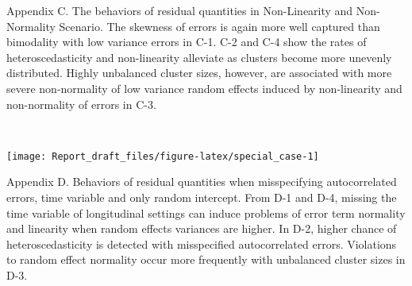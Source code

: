 \documentclass[12pt]{article}
\begin{document}
\vspace{-10pt}

\begin{spacing}{0.5}
\begingroup
{}\fontsize{6}{16}\selectfont
Appendix C. The behaviors of residual quantities in Non-Linearity and Non-Normality Scenario.
The skewness of errors is again more well captured than bimodality with low variance errors in C-1. C-2 and C-4 show the rates of heteroscedasticity and non-linearity alleviate as clusters become more unevenly distributed. Highly unbalanced cluster sizes, however, are associated with more severe non-normality of low variance random effects induced by non-linearity and non-normality of errors in C-3. 
\endgroup
\end{spacing}

~

\begin{center}\texttt{[image: Report\_draft\_files/figure-latex/special\_case-1]} \end{center}

\vspace{-10pt}

\begin{spacing}{0.5}
\begingroup
{}\fontsize{6}{16}\selectfont
Appendix D. Behaviors of residual quantities when misspecifying autocorrelated errors, time variable and only random intercept.
From D-1 and D-4, missing the time variable of longitudinal settings can induce problems of error term normality and linearity when random effects variances are higher. In D-2, higher chance of heteroscedasticity is detected with misspecified autocorrelated errors. Violations to random effect normality occur more frequently with unbalanced cluster sizes in D-3. 
\endgroup
\end{spacing}

~

\newpage



\end{document}
